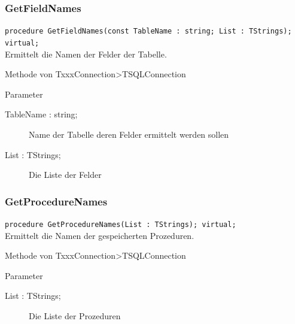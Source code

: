 \subsubsection{GetFieldNames}
\begin{description}
  \item \texttt{procedure GetFieldNames(const TableName : string; List :  TStrings); virtual;}\\Ermittelt die Namen der Felder der Tabelle.
  \begin{description}
    \item Methode von TxxxConnection>TSQLConnection
  \end{description}
  \begin{description}
    \item Parameter
    \begin{description}
      \item[TableName : string;] Name der Tabelle deren Felder ermittelt werden sollen
      \item[List : TStrings;] Die Liste der Felder
    \end{description}
  \end{description}
\end{description}

\subsubsection{GetProcedureNames}
\begin{description}
  \item \texttt{procedure GetProcedureNames(List : TStrings); virtual;}\\Ermittelt die Namen der gespeicherten Prozeduren.
  \begin{description}
    \item Methode von TxxxConnection>TSQLConnection
  \end{description}
  \begin{description}
    \item Parameter
    \begin{description}
      \item[List : TStrings;] Die Liste der Prozeduren
    \end{description}
  \end{description}
\end{description}

